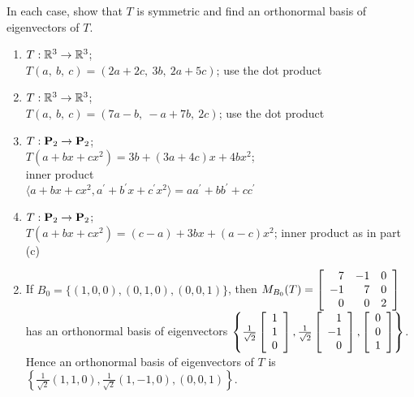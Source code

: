 \begin{multicols}{2}
\begin{ex}
\begin{sol}
\begin{enumerate}[label={\alph*.}]
\end{enumerate}
\end{sol}
\end{ex}

\begin{ex}
In each case, show that $T$ is symmetric and find an orthonormal basis of eigenvectors of $T$.

\begin{enumerate}[label={\alph*.}]
\item $ T : \mathbb{R}^3 \to \mathbb{R}^3$; \\ $T(a, \ b, \ c) = (2a + 2c, \ 3b, \ 2a + 5c)$; use the dot product

\item $ T : \mathbb{R}^3 \to \mathbb{R}^3$; \\ $T(a, \ b, \ c) = (7a - b, \ -a + 7b, \ 2c)$; use the dot product

\item $ T : \textbf{P}_2 \to \textbf{P}_2$; \\ $T(a + bx + cx^2) = 3b + (3a + 4c)x + 4bx^2$; \\ inner product \\ $\langle a + bx + cx^2, a^\prime + b^\prime x + c^\prime x^2 \rangle = aa^\prime + bb^\prime + cc^ \prime$

\item $T : \textbf{P}_2 \to \textbf{P}_2$; \\ $T(a + bx + cx^2) = (c  - a) + 3bx + (a - c)x^2$; inner product as in part (c)

\end{enumerate}
\begin{sol}
	\begin{enumerate}[label={\alph*.}]
		\setcounter{enumi}{1}
		\item If $B_{0} = \{(1, 0, 0), (0, 1, 0), (0, 0, 1)\}$, then
$M_{B_0}(T) = 
\left[ \begin{array}{rrr}
7 & -1 & 0 \\
-1 & 7 & 0 \\
0 & 0 & 2
\end{array} \right]$ has an orthonormal basis of eigenvectors $\left\{
\tfrac{1}{\sqrt{2}}
\left[ \begin{array}{r}
1 \\
1 \\
0
\end{array} \right]
,
\tfrac{1}{\sqrt{2}}
\left[ \begin{array}{r}
1 \\
-1 \\
0
\end{array} \right]
,
\left[ \begin{array}{r}
0 \\
0 \\
1
\end{array} \right]
\right\}$. Hence an orthonormal basis of eigenvectors of $T$ is
$ \left\{\frac{1}{\sqrt{2}}(1, 1, 0), \frac{1}{\sqrt{2}}(1, -1, 0), (0, 0, 1) \right\} $.


\end{enumerate}
\end{sol}
\end{ex}
\end{multicols}
